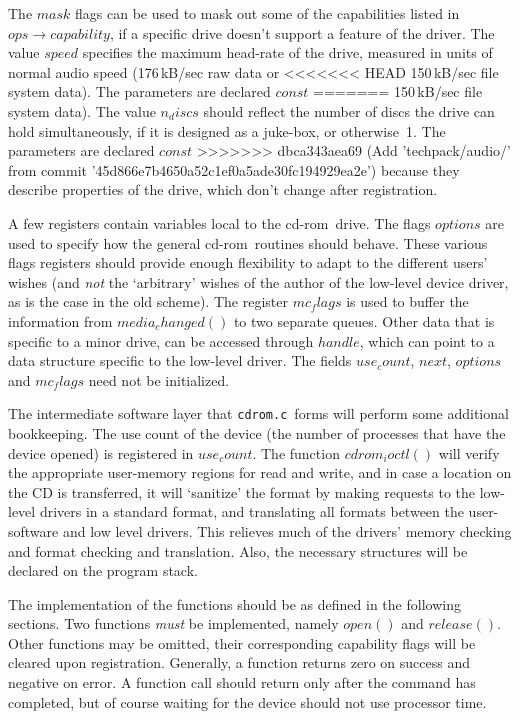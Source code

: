 \documentclass{article}
\def\cdrom{{\sc cd-rom}}
\def\cdromc{{\tt {cdrom.c}}}
\begin{document}
The $mask$ flags can be used to mask out some of the capabilities listed
in $ops\to capability$, if a specific drive doesn't support a feature
of the driver. The value $speed$ specifies the maximum head-rate of the
drive, measured in units of normal audio speed (176\,kB/sec raw data or
<<<<<<< HEAD
150\,kB/sec file system data).  The parameters are declared $const$
=======
150\,kB/sec file system data). The value $n_discs$ should reflect the
number of discs the drive can hold simultaneously, if it is designed
as a juke-box, or otherwise~1. The parameters are declared $const$
>>>>>>> dbca343aea69 (Add 'techpack/audio/' from commit '45d866e7b4650a52c1ef0a5ade30fc194929ea2e')
because they describe properties of the drive, which don't change after
registration.

A few registers contain variables local to the \cdrom\ drive. The
flags $options$ are used to specify how the general \cdrom\ routines
should behave. These various flags registers should provide enough
flexibility to adapt to the different users' wishes (and {\em not\/} the
`arbitrary' wishes of the author of the low-level device driver, as is
the case in the old scheme). The register $mc_flags$ is used to buffer
the information from $media_changed()$ to two separate queues. Other
data that is specific to a minor drive, can be accessed through $handle$,
which can point to a data structure specific to the low-level driver.
The fields $use_count$, $next$, $options$ and $mc_flags$ need not be
initialized.

The intermediate software layer that \cdromc\ forms will perform some
additional bookkeeping. The use count of the device (the number of
processes that have the device opened) is registered in $use_count$. The
function $cdrom_ioctl()$ will verify the appropriate user-memory regions
for read and write, and in case a location on the CD is transferred,
it will `sanitize' the format by making requests to the low-level
drivers in a standard format, and translating all formats between the
user-software and low level drivers. This relieves much of the drivers'
memory checking and format checking and translation. Also, the necessary
structures will be declared on the program stack.

The implementation of the functions should be as defined in the
following sections. Two functions {\em must\/} be implemented, namely
$open()$ and $release()$. Other functions may be omitted, their
corresponding capability flags will be cleared upon registration.
Generally, a function returns zero on success and negative on error. A
function call should return only after the command has completed, but of
course waiting for the device should not use processor time.
\end{document}
